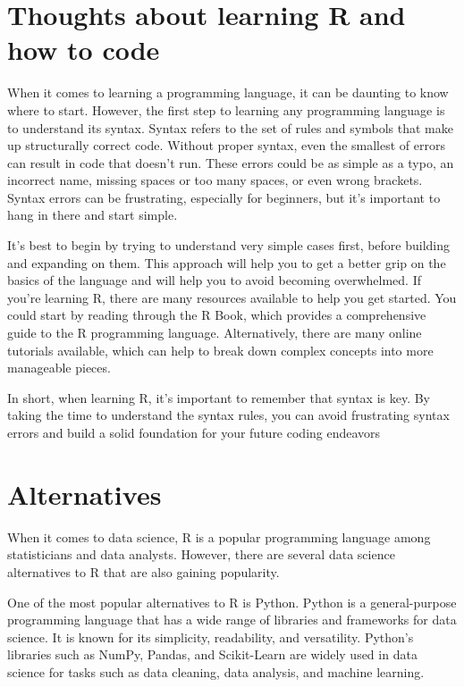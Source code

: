 \documentclass[
]{book}
\begin{document}
\hypertarget{thoughts-about-learning-r-and-how-to-code}{%
\section*{Thoughts about learning R and how to code}\label{thoughts-about-learning-r-and-how-to-code}}

When it comes to learning a programming language, it can be daunting to know where to start. However, the first step to learning any programming language is to understand its syntax. Syntax refers to the set of rules and symbols that make up structurally correct code. Without proper syntax, even the smallest of errors can result in code that doesn't run. These errors could be as simple as a typo, an incorrect name, missing spaces or too many spaces, or even wrong brackets. Syntax errors can be frustrating, especially for beginners, but it's important to hang in there and start simple.

It's best to begin by trying to understand very simple cases first, before building and expanding on them. This approach will help you to get a better grip on the basics of the language and will help you to avoid becoming overwhelmed. If you're learning R, there are many resources available to help you get started. You could start by reading through the R Book, which provides a comprehensive guide to the R programming language. Alternatively, there are many online tutorials available, which can help to break down complex concepts into more manageable pieces.

In short, when learning R, it's important to remember that syntax is key. By taking the time to understand the syntax rules, you can avoid frustrating syntax errors and build a solid foundation for your future coding endeavors

\hypertarget{alternatives}{%
\section*{Alternatives}\label{alternatives}}

When it comes to data science, R is a popular programming language among statisticians and data analysts. However, there are several data science alternatives to R that are also gaining popularity.

One of the most popular alternatives to R is Python. Python is a general-purpose programming language that has a wide range of libraries and frameworks for data science. It is known for its simplicity, readability, and versatility. Python's libraries such as NumPy, Pandas, and Scikit-Learn are widely used in data science for tasks such as data cleaning, data analysis, and machine learning.
\end{document}
